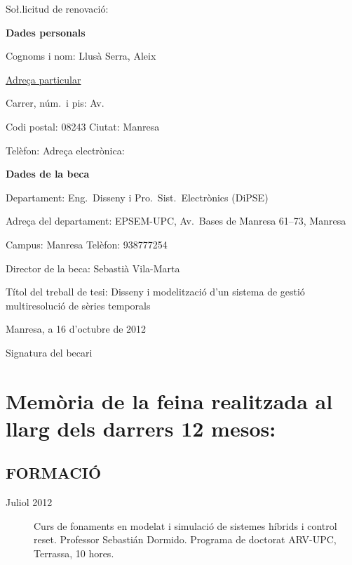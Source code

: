 \mbox{}\vspace{1cm}

So\l.licitud de renovació:

\vfill

\textbf{Dades personals}

Cognoms i nom: Llusà Serra, Aleix

\underline{Adreça particular}

Carrer, núm.\ i pis: Av.\ 

Codi postal: 08243   Ciutat: Manresa

Telèfon:     Adreça electrònica:


\vspace{2cm}


\textbf{Dades de la beca}

Departament: Eng.\ Disseny i Pro.\ Sist.\ Electrònics (DiPSE)

Adreça del departament: EPSEM-UPC, Av.\ Bases de Manresa 61--73, Manresa

Campus: Manresa  Telèfon: 938777254

Director de la beca: Sebastià Vila-Marta

Títol del treball de tesi: Disseny i modelització d'un sistema de gestió multiresolució de sèries temporals


\vfill

Manresa, a 16 d'octubre de 2012

\vspace{2cm}

Signatura del becari





\newpage

\renewcommand*\descriptionlabel[1]{\hspace\labelsep\normalfont #1:}

\section*{Memòria de la feina realitzada al llarg dels darrers 12 mesos:}

\subsection*{FORMACIÓ}

\begin{description}



\item[Juliol 2012] Curs de fonaments en modelat i simulació de
  sistemes híbrids i control reset. Professor Sebastián
  Dormido. Programa de doctorat ARV-UPC, Terrassa, 10 hores.

\end{description}



